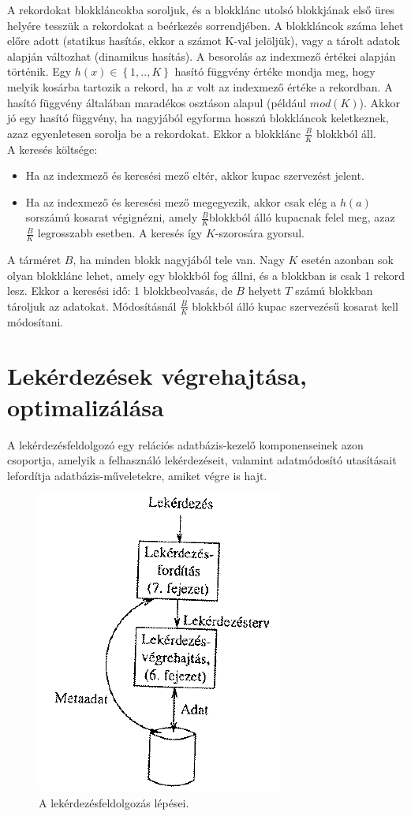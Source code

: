 \documentclass[margin=0px]{article}
\begin{document}
	A rekordokat blokkláncokba soroljuk, és a blokklánc utolsó blokkjának
	első üres helyére tesszük a rekordokat a beérkezés sorrendjében. A blokkláncok száma lehet előre adott
	(statikus hasítás, ekkor a számot K-val jelöljük), vagy a tárolt adatok alapján változhat (dinamikus hasítás).
	A besorolás az indexmező értékei alapján történik. Egy $h(x) \in \left\{1,..,K\right\}$ hasító függvény értéke mondja meg,
	hogy melyik kosárba tartozik a rekord, ha $x$ volt az indexmező értéke a rekordban. A hasító függvény
	általában maradékos osztáson alapul (például $mod(K)$). Akkor jó egy hasító függvény, ha nagyjából egyforma
	hosszú blokkláncok keletkeznek, azaz egyenletesen sorolja be a rekordokat. Ekkor a blokklánc $\frac{B}{K}$ blokkból áll.\\
	
	\noindent A keresés költsége:
	\begin{itemize}
		\item	Ha az indexmező és keresési mező eltér, akkor kupac szervezést jelent.
		\item	Ha az indexmező és keresési mező megegyezik, akkor csak elég a $h(a)$ sorszámú kosarat végignézni,
		amely $\frac{B}{K}$blokkból álló kupacnak felel meg, azaz $\frac{B}{K}$ legrosszabb esetben.
		A keresés így $K$-szorosára gyorsul.
	\end{itemize}
	
	A tárméret $B$, ha minden blokk nagyjából tele van. Nagy $K$ esetén azonban sok olyan blokklánc lehet,
	amely egy blokkból fog állni, és a blokkban is csak 1 rekord lesz. Ekkor a keresési idő: 1 blokkbeolvasás,
	de $B$ helyett $T$ számú blokkban tároljuk az adatokat. Módosításnál $\frac{B}{K}$ blokkból álló kupac
	szervezésű kosarat kell módosítani.
	
	\section{Lekérdezések végrehajtása, optimalizálása}
	
	A lekérdezésfeldolgozó egy relációs adatbázis-kezelő komponenseinek azon csoportja, amelyik a felhasználó lekérdezéseit,
	valamint adatmódosító utasításait lefordítja adatbázis-műveletekre, amiket végre is hajt.
	
	\begin{figure}[H]
		\centering
		\includegraphics[width=0.3\linewidth]{img/queryprocessing}
		\caption{A lekérdezésfeldolgozás lépései.}
		\label{fig:queryprocessing}
	\end{figure}
	
\end{document}
